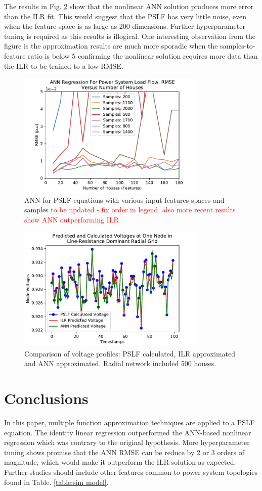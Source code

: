 \documentclass[conference]{IEEEtran}
\begin{document}
The results in Fig. \ref{fig:annresults} show that the nonlinear ANN solution produces more error than the ILR fit. This would suggest that the PSLF has very little noise, even when the feature space is as large as 200 dimensions. Further hyperparameter tuning is required as this results is illogical. One interesting observation from the figure is the approximation results are much more sporadic when the samples-to-feature ratio is below 5 confirming the nonlinear solution requires more data than the ILR to be trained to a low RMSE.

\begin{figure}[h]
	\centering
	\includegraphics[width=9cm]{annrmsevsfeatures_familyofcurves.pdf}
	\caption{ANN for PSLF equations with various input features spaces and samples \textcolor{red}{to be updated - fix order in legend, also more recent results show ANN outperforming ILR}}
	\label{fig:annresults}
\end{figure}

\begin{figure}[h]
	\centering
	\includegraphics[width=9cm]{comparingvoltages_500.pdf}
	\caption{Comparison of voltage profiles: PSLF calculated, ILR approximated and ANN approximated. Radial network included 500 houses.}
	\label{fig:annresults}
\end{figure}

\section{Conclusions}
\label{sec:conc}
In this paper, multiple function approximation techniques are applied to a PSLF equation. The identity linear regression outperformed the ANN-based nonlinear regression which was contrary to the original hypothesis. More hyperparameter tuning shows promise that the ANN RMSE can be reduce by 2 or 3 orders of magnitude, which would make it outperform the ILR solution as expected. Further studies should include other features common to power system topologies found in Table. \ref{table:sim model}.
\end{document}
